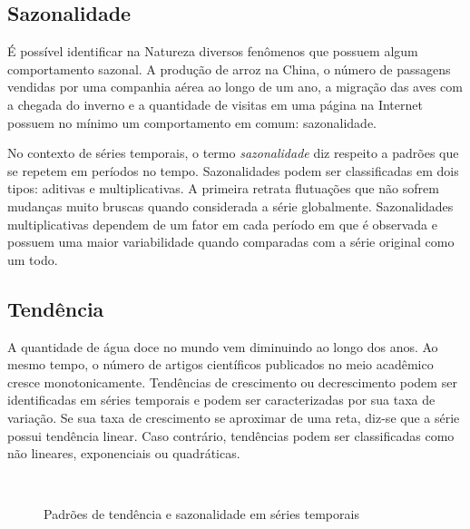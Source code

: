 \subsection{Sazonalidade}
\label{sub:sazonalidade}
É possível identificar na Natureza diversos fenômenos que possuem algum comportamento sazonal. A produção de arroz na China, o número de passagens vendidas por uma companhia aérea ao longo de um ano, a migração das aves com a chegada do inverno e a quantidade de visitas em uma página na Internet possuem no mínimo um comportamento em comum: sazonalidade.

No contexto de séries temporais, o termo \textit{sazonalidade} diz respeito a padrões que se repetem em períodos no tempo. Sazonalidades podem ser classificadas em dois tipos: aditivas e multiplicativas. A primeira retrata flutuações que não sofrem mudanças muito bruscas quando considerada a série globalmente. Sazonalidades multiplicativas dependem de um fator em cada período em que é observada e possuem uma maior variabilidade quando comparadas com a série original como um todo.

\subsection{Tendência}
A quantidade de água doce no mundo vem diminuindo ao longo dos anos. Ao mesmo tempo, o número de artigos científicos publicados no meio acadêmico cresce monotonicamente. Tendências de crescimento ou decrescimento podem ser identificadas em séries temporais e podem ser caracterizadas por sua taxa de variação. Se sua taxa de crescimento se aproximar de uma reta, diz-se que a série possui tendência linear. Caso contrário, tendências podem ser classificadas como não lineares, exponenciais ou quadráticas.


\begin{figure}[htb!]
  \begin{center}
     \quad
     \quad
    \\
     \quad
     \quad
    \centering
    \caption{Padrões de tendência e sazonalidade em séries temporais}
  \label{fig:tend-sazonalidade}
  \end{center}
\end{figure}

